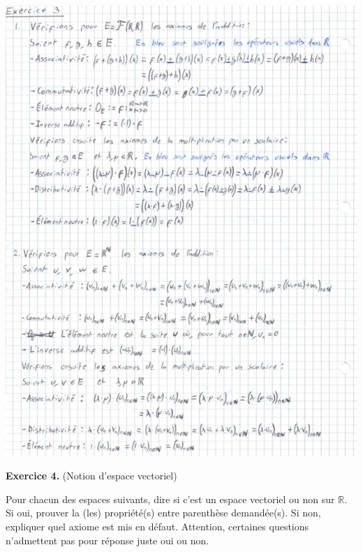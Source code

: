 \documentclass[a4paper, 10pt]{report}
\begin{document}
	\includegraphics{ex03.png}

	\vspace{5mm}
	\noindent \textbf{Exercice 4.} (Notion d'espace vectoriel)
	
	\indent Pour chacun des espaces suivants, dire si c'est un espace vectoriel ou non sur $\mathbb{R}$. Si oui, prouver la (les) propriété(s) entre parenthèse demandée(s). Si non, expliquer quel axiome est mis en défaut. Attention, certaines questions n'admettent pas pour réponse juste oui ou non.
	
\end{document}
